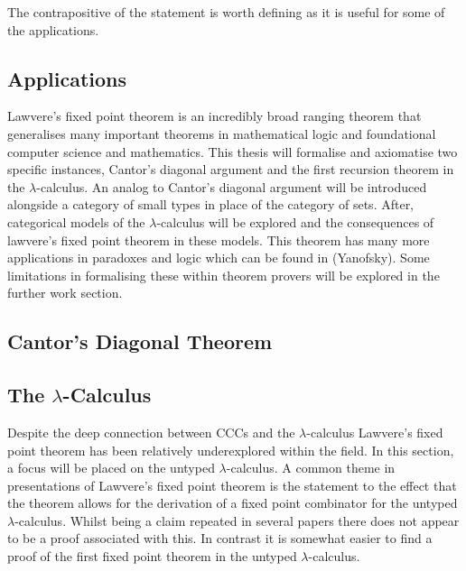 The contrapositive of the statement is worth defining as it is useful for some
of the applications.

\subsection{Applications}

Lawvere's fixed point theorem is an incredibly broad ranging theorem that
generalises many important theorems in mathematical logic and foundational
computer science and mathematics. This thesis will formalise and axiomatise two
specific instances, Cantor's diagonal argument and the first recursion theorem
in the $\lambda$-calculus. An analog to Cantor's diagonal argument will be introduced
alongside a category of small types in place of the category of sets.
After, categorical models of the $\lambda$-calculus will be explored and the
consequences of lawvere's fixed point theorem in these models. This theorem has
many more applications in paradoxes and logic which can be found in (Yanofsky).
Some limitations in formalising these within theorem provers will be explored in
the further work section.
\subsection{Cantor's Diagonal Theorem}

\subsection{The $\lambda$-Calculus}

Despite the deep connection between CCCs and the $\lambda$-calculus 
Lawvere's fixed point theorem has been relatively underexplored within the
field. In this section, a focus will be placed on the untyped
$\lambda$-calculus. A common theme in presentations of Lawvere's fixed point
theorem is the statement to the effect that the theorem allows for the
derivation of a fixed point combinator for the untyped $\lambda$-calculus.
Whilst being a claim repeated in several papers there does not appear to be a
proof associated with this. In contrast it is somewhat easier to find a proof
of the first fixed point theorem in the untyped $\lambda$-calculus. 

